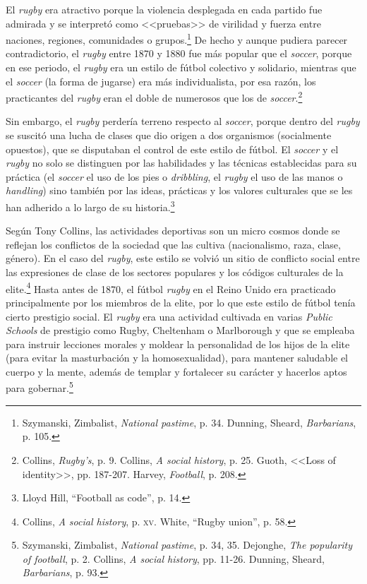 \documentclass[11pt,a5paper,twoside]{book} %
\begin{document}
El \emph{rugby} era atractivo porque la violencia desplegada en cada partido fue admirada y se interpretó como <<pruebas>> de virilidad y fuerza entre naciones, regiones, comunidades o grupos.\footnote{Szymanski, Zimbalist, \emph{National pastime}, p. 34. Dunning, Sheard, \emph{Barbarians}, p. 105.} De hecho y aunque pudiera parecer contradictorio, el \emph{rugby} entre 1870 y 1880 fue más popular que el \emph{soccer}, porque en ese periodo, el \emph{rugby} era un estilo de fútbol colectivo y solidario, mientras que el \emph{soccer} (la forma de jugarse) era más individualista, por esa razón, los practicantes del \emph{rugby} eran el doble de numerosos que los de \emph{soccer}.\footnote{Collins, \emph{Rugby's}, p. 9. Collins, \emph{A social history}, p. 25. Guoth, <<Loss of identity>>, pp. 187-207. Harvey, \emph{Football}, p. 208.}

Sin embargo, el \emph{rugby} perdería terreno respecto al \emph{soccer}, porque dentro del \emph{rugby} se suscitó una lucha de clases que dio origen a dos organismos (socialmente opuestos), que se disputaban el control de este estilo de fútbol. El \emph{soccer} y el \emph{rugby} no solo se distinguen por las habilidades y las técnicas establecidas para su práctica (el \emph{soccer} el uso de los pies o \emph{dribbling}, el \emph{rugby} el uso de las manos o \emph{handling}) sino también por las ideas, prácticas y los valores culturales que se les han adherido a lo largo de su historia.\footnote{Lloyd Hill, ``Football as code'', p. 14.}

Según Tony Collins, las actividades deportivas son un micro cosmos donde se reflejan los conflictos de la sociedad que las cultiva (nacionalismo, raza, clase, género). En el caso del \emph{rugby}, este estilo se volvió un sitio de conflicto social entre las expresiones de clase de los sectores populares y los códigos culturales de la elite.\footnote{Collins, \emph{A social history}, p. \textsc{xv}. White, ``Rugby union'', p. 58.} Hasta antes de 1870, el fútbol \emph{rugby} en el Reino Unido era practicado principalmente por los miembros de la elite, por lo que este estilo de fútbol tenía cierto prestigio social. El \emph{rugby} era una actividad cultivada en varias \emph{Public Schools} de prestigio como Rugby, Cheltenham o Marlborough y que se empleaba para instruir lecciones morales y moldear la personalidad de los hijos de la elite (para evitar la masturbación y la homosexualidad), para mantener saludable el cuerpo y la mente, además de templar y fortalecer su carácter y hacerlos aptos para gobernar.\footnote{Szymanski, Zimbalist, \emph{National pastime}, p. 34, 35. Dejonghe, \emph{The popularity of football}, p. 2. Collins, \emph{A social history}, pp. 11-26. Dunning, Sheard, \emph{Barbarians}, p. 93.}
\end{document}
